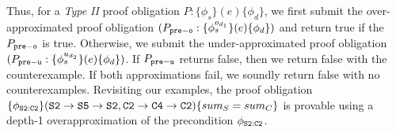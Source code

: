 Thus, for a {\em Type II} proof obligation $P: \{\phi_s\} (e) \{\phi_d\}$,
we first submit the over-approximated proof obligation $(P_{{\tt pre-o}}: \{\phi^{o_{d_1}}_s\} (e) \{\phi_d\})$
and return true if the $P_{{\tt pre-o}}$ is true.
Otherwise, we submit the under-approximated proof obligation $(P_{{\tt pre-u}}: \{\phi^{u_{d_2}}_s\} (e) \{\phi_d\})$.
If $P_{{\tt pre-u}}$ returns false, then we return false with the counterexample.
If both approximations fail, we soundly return false with no counterexamples.
Revisiting our examples,
the proof obligation $\{\phi_{{\tt S2:C2}}\} ({\tt S2\rightarrow S5\rightarrow S2}, {\tt C2\rightarrow C4\rightarrow C2}) \\ \{sum_{S} = sum_{C}\}$ is
provable using a depth-1 overapproximation of the
precondition $\phi_{{\tt S2:C2}}$.

